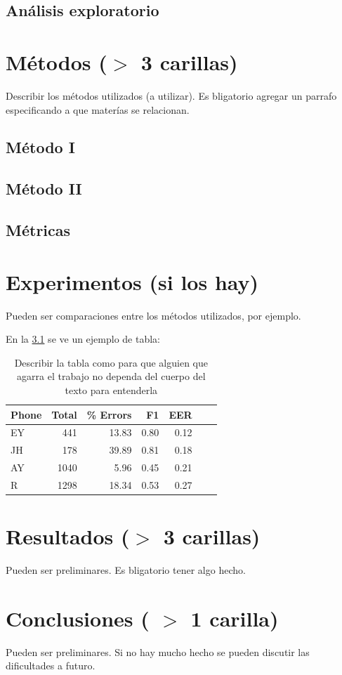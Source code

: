 \documentclass[11pt,a4paper,twoside]{tesis}
\begin{document}
\section{Análisis exploratorio}

\chapter{Métodos ($>$ 3 carillas)}
Describir los métodos utilizados (a utilizar). 
Es bligatorio agregar un parrafo especificando a que materías se relacionan.

\section{Método I }
\section{Método II}
\section{Métricas}

\chapter{Experimentos (si los hay)}
Pueden ser comparaciones entre los métodos utilizados, por ejemplo. 

En la \ref{table:tab} se ve un ejemplo de tabla:
\begin{table}[h!]
\centering
\footnotesize
\begin{tabular}{lrrrrrr}
\hline
Phone &  Total & \% Errors &F1 &  EER \\
\hline
   EY &    441 &  13.83 & 0.80 & 0.12 \\
   JH &    178 &  39.89 & 0.81 & 0.18 \\
   AY &   1040 &   5.96 & 0.45 & 0.21 \\
    R &   1298 &  18.34 & 0.53 & 0.27 \\
\hline
\end{tabular}
\caption{Describir la tabla como para que alguien que agarra el trabajo no dependa del cuerpo del texto para entenderla}
\label{table:tab}
\end{table}

\chapter{Resultados ($>$ 3 carillas)}
Pueden ser preliminares. Es bligatorio tener algo hecho.


\chapter{Conclusiones ( $>$ 1 carilla)} 
Pueden ser preliminares. 
Si no hay mucho hecho se pueden discutir las dificultades a futuro.


\backmatter
%
\end{document}
